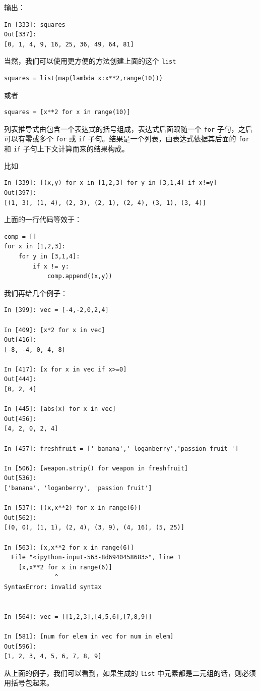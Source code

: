 \documentclass[10pt,a4paper,UTF8]{article}
\begin{document}
输出：
\begin{verbatim}
In [333]: squares
Out[337]: 
[0, 1, 4, 9, 16, 25, 36, 49, 64, 81]
\end{verbatim}
当然，我们可以使用更方便的方法创建上面的这个 \texttt{list} 

\begin{verbatim}
squares = list(map(lambda x:x**2,range(10)))
\end{verbatim}
或者
\begin{verbatim}
squares = [x**2 for x in range(10)]
\end{verbatim}

列表推导式由包含一个表达式的括号组成，表达式后面跟随一个 \texttt{for} 子句，之后可以有零或多个 \texttt{for} 或 \texttt{if} 子句。结果是一个列表，由表达式依据其后面的 \texttt{for} 和 \texttt{if} 子句上下文计算而来的结果构成。

比如
\begin{verbatim}
In [339]: [(x,y) for x in [1,2,3] for y in [3,1,4] if x!=y]
Out[397]: 
[(1, 3), (1, 4), (2, 3), (2, 1), (2, 4), (3, 1), (3, 4)]
\end{verbatim}
上面的一行代码等效于：
\lstset{language=Python,label= ,caption= ,captionpos=b,firstnumber=1,numbers=left}
\begin{lstlisting}
comp = []
for x in [1,2,3]:
    for y in [3,1,4]:
        if x != y:
            comp.append((x,y))
\end{lstlisting}
我们再给几个例子：
\begin{verbatim}
In [399]: vec = [-4,-2,0,2,4]

In [409]: [x*2 for x in vec]
Out[416]: 
[-8, -4, 0, 4, 8]

In [417]: [x for x in vec if x>=0]
Out[444]: 
[0, 2, 4]

In [445]: [abs(x) for x in vec]
Out[456]: 
[4, 2, 0, 2, 4]

In [457]: freshfruit = [' banana',' loganberry','passion fruit ']

In [506]: [weapon.strip() for weapon in freshfruit]
Out[536]: 
['banana', 'loganberry', 'passion fruit']

In [537]: [(x,x**2) for x in range(6)]
Out[562]: 
[(0, 0), (1, 1), (2, 4), (3, 9), (4, 16), (5, 25)]

In [563]: [x,x**2 for x in range(6)]
  File "<ipython-input-563-8d6940458683>", line 1
    [x,x**2 for x in range(6)]
              ^
SyntaxError: invalid syntax


In [564]: vec = [[1,2,3],[4,5,6],[7,8,9]]

In [581]: [num for elem in vec for num in elem]
Out[596]: 
[1, 2, 3, 4, 5, 6, 7, 8, 9]
\end{verbatim}
从上面的例子，我们可以看到，如果生成的 \texttt{list} 中元素都是二元组的话，则必须用括号包起来。
\end{document}
